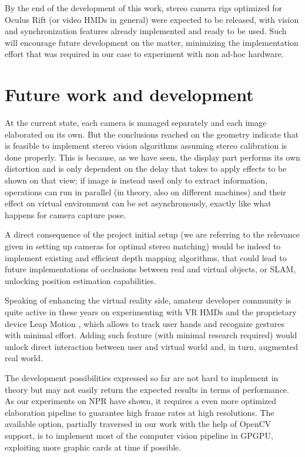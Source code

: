 By the end of the development of this work, stereo camera rigs optimized for Oculus Rift (or video HMDs in general) were expected to be released, with vision and synchronization features already implemented and ready to be used. Such will encourage future development on the matter, minimizing the implementation effort that was required in our case to experiment with non ad-hoc hardware.

\section{Future work and development}
At the current state, each camera is managed separately and each image elaborated on its own. But the conclusions reached on the geometry indicate that is feasible to implement stereo vision algorithms assuming stereo calibration is done properly. This is because, as we have seen, the display part performs its own distortion and is only dependent on the delay that takes to apply effects to be shown on that view; if image is instead used only to extract information, operations can run in parallel (in theory, also on different machines) and their effect on virtual environment can be set asynchronously, exactly like what happens for camera capture pose.

A direct consequence of the project initial setup (we are referring to the relevance given in setting up cameras for optimal stereo matching) would be indeed to implement existing and efficient depth mapping algorithms, that could lead to future implementations of occlusions between real and virtual objects, or SLAM, unlocking position estimation capabilities.

Speaking of enhancing the virtual reality side, amateur developer community is quite active in these years on experimenting with VR HMDs and the proprietary device Leap Motion \cite{leap_motion}, which allows to track user hands and recognize gestures with minimal effort. Adding such feature (with minimal research required) would unlock direct interaction between user and virtual world and, in turn, augmented real world.

The development possibilities expressed so far are not hard to implement in theory but may not easily return the expected results in terms of performance. As our experiments on NPR have shown, it requires a even more optimized elaboration pipeline to guarantee high frame rates at high resolutions. The available option, partially traversed in our work with the help of OpenCV support, is to implement most of the computer vision pipeline in GPGPU, exploiting more graphic cards at time if possible.

